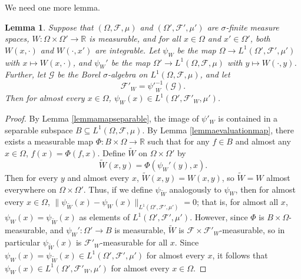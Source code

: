 \documentclass{amsart}
\numberwithin{equation}{section}
\numberwithin{figure}{section}
\newtheorem{lemma}[theorem]{Lemma}
\theoremstyle{definition}
\theoremstyle{remark}
\newcommand{\RR}{\mathbb{R}}
\newcommand{\cF}{\mathcal{F}}
\newcommand{\cG}{\mathcal{G}}
\begin{document}
We need one more lemma.

\begin{lemma} \label{lemmacontainedinFW}
Suppose that $(\Omega,\cF,\mu)$ and $(\Omega',\cF',\mu')$ are $\sigma$-finite
measure spaces, $W\colon \Omega \times \Omega' \rightarrow {\RR}$ is
measurable, and for all $x\in \Omega$ and $x'\in\Omega'$, both $W(x,\cdot)$
and $W(\cdot,x')$ are integrable. Let $\psi_W$ be the map $\Omega \rightarrow
L^1(\Omega',\cF'{,\mu'})$ with $x \mapsto W(x,\cdot)$, and $\psi_W'$ be the
map $\Omega' \rightarrow L^1(\Omega,\cF{,\mu})$ {with} $y \mapsto
W(\cdot,y)$. Further, let $\cG$ be the Borel $\sigma$-algebra on
$L^1(\Omega,\cF,\mu)$, and let
\[\cF'_W={\psi'}_W^{-1}({\cG}).
\]
Then for almost every $x \in \Omega$,
$\psi_W(x)\in L^1(\Omega',\cF'_W{,\mu'})$.
\end{lemma}

\begin{proof}
By Lemma \ref{lemmamapseparable}, {the} image of $\psi'_W$ is contained in a
separable subspace $B \subseteq L^1(\Omega,\cF{,\mu})$. By Lemma
\ref{lemmaevaluationmap}, there exists a measurable map $\Phi\colon B \times
\Omega \rightarrow \mathbb{R}$ such that for any $f \in B$ and almost any $x
\in \Omega$, $f(x)=\Phi(f,x)$. Define $\widetilde{W}$ on $\Omega \times
\Omega'$ by
\[\widetilde{W}(x,y)=\Phi(\psi_{W}'(y),x).\]
Then for every $y$ and almost every $x$, $\widetilde{W}(x,y)=W(x,y)$, so
$\widetilde{W}=W$ almost everywhere on $\Omega \times \Omega'$. Thus, if we
define $\psi_{\widetilde{W}}$ analogously to $\psi_W$, then for almost every
$x\in\Omega$,
$\|\psi_{\widetilde{W}}(x)-\psi_W(x)\|_{L^1(\Omega',\cF',\mu')}=0$; that is,
for almost all $x$, $\psi_W(x)=\psi_{\widetilde W}(x)$ as elements of
$L^1(\Omega',\cF'{,\mu'})$. However, since $\Phi$ is $B \times
\Omega$-measurable, and $\psi_W'\colon \Omega' \rightarrow B$ is measurable,
$\widetilde{W}$ is $\cF \times \cF'_W$-measurable, so in particular
$\psi_{\widetilde W}(x)$ is $\cF'_W$-measurable for all $x$. Since
$\psi_W(x)=\psi_{\widetilde{W}}(x)\in L^1(\Omega',\cF'{,\mu'})$ for almost
every $x$, it follows that $\psi_W(x) \in L^1(\Omega',\cF'_W{,\mu'})$ for
almost every $x\in\Omega$.
\end{proof}
\end{document}
